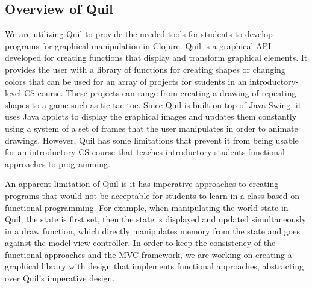 \documentclass[12pt]{article}
\newcommand{\comment}[1]{{\bf \tt  {#1}}}
\newcommand{\todo}[1]{\textcolor{blue}{\comment{To Do: {#1}}}}
\begin{document}
\subsection{Overview of Quil}\label{subsec:quil}
We are utilizing Quil to provide the needed tools for students to develop programs for graphical manipulation in Clojure. Quil is a graphical API developed for creating functions that display and transform graphical elements. It provides the user with a library of functions for creating shapes or changing colors that can be used for an array of projects for students in an introductory-level CS course. These projects can range from creating a drawing of repeating shapes to a game such as tic tac toe. Since Quil is built on top of Java Swing, it uses Java applets to display the graphical images and updates them constantly using a system of a set of frames that the user manipulates in order to animate drawings. However, Quil has some limitations that prevent it from being usable for an introductory CS course that teaches introductory students functional approaches to programming.

An apparent limitation of Quil is it has imperative approaches to creating programs that would not be acceptable for students to learn in a class based on functional programming. For example, when manipulating the world state in Quil, the state is first set, then the state is displayed and updated simultaneously in a draw function, which directly manipulates memory from the state and goes against the model-view-controller. In order to keep the consistency of the functional approaches and the MVC framework, we are working on creating a graphical library with design that implements functional approaches, abstracting over Quil's imperative design. 
\end{document}
